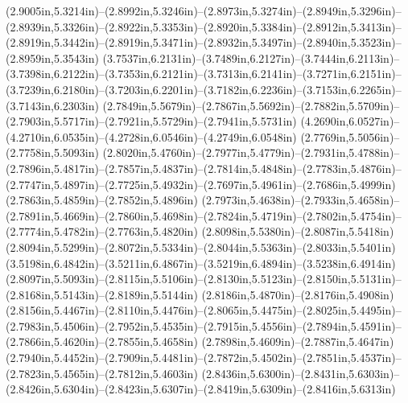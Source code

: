 (2.9005in,5.3214in)--(2.8992in,5.3246in)--(2.8973in,5.3274in)--(2.8949in,5.3296in)--(2.8939in,5.3326in)--(2.8922in,5.3353in)--(2.8920in,5.3384in)--(2.8912in,5.3413in)--(2.8919in,5.3442in)--(2.8919in,5.3471in)--(2.8932in,5.3497in)--(2.8940in,5.3523in)--(2.8959in,5.3543in) (3.7537in,6.2131in)--(3.7489in,6.2127in)--(3.7444in,6.2113in)--(3.7398in,6.2122in)--(3.7353in,6.2121in)--(3.7313in,6.2141in)--(3.7271in,6.2151in)--(3.7239in,6.2180in)--(3.7203in,6.2201in)--(3.7182in,6.2236in)--(3.7153in,6.2265in)--(3.7143in,6.2303in) (2.7849in,5.5679in)--(2.7867in,5.5692in)--(2.7882in,5.5709in)--(2.7903in,5.5717in)--(2.7921in,5.5729in)--(2.7941in,5.5731in) (4.2690in,6.0527in)--(4.2710in,6.0535in)--(4.2728in,6.0546in)--(4.2749in,6.0548in) (2.7769in,5.5056in)--(2.7758in,5.5093in) (2.8020in,5.4760in)--(2.7977in,5.4779in)--(2.7931in,5.4788in)--(2.7896in,5.4817in)--(2.7857in,5.4837in)--(2.7814in,5.4848in)--(2.7783in,5.4876in)--(2.7747in,5.4897in)--(2.7725in,5.4932in)--(2.7697in,5.4961in)--(2.7686in,5.4999in) (2.7863in,5.4859in)--(2.7852in,5.4896in) (2.7973in,5.4638in)--(2.7933in,5.4658in)--(2.7891in,5.4669in)--(2.7860in,5.4698in)--(2.7824in,5.4719in)--(2.7802in,5.4754in)--(2.7774in,5.4782in)--(2.7763in,5.4820in) (2.8098in,5.5380in)--(2.8087in,5.5418in) (2.8094in,5.5299in)--(2.8072in,5.5334in)--(2.8044in,5.5363in)--(2.8033in,5.5401in) (3.5198in,6.4842in)--(3.5211in,6.4867in)--(3.5219in,6.4894in)--(3.5238in,6.4914in) (2.8097in,5.5093in)--(2.8115in,5.5106in)--(2.8130in,5.5123in)--(2.8150in,5.5131in)--(2.8168in,5.5143in)--(2.8189in,5.5144in) (2.8186in,5.4870in)--(2.8176in,5.4908in) (2.8156in,5.4467in)--(2.8110in,5.4476in)--(2.8065in,5.4475in)--(2.8025in,5.4495in)--(2.7983in,5.4506in)--(2.7952in,5.4535in)--(2.7915in,5.4556in)--(2.7894in,5.4591in)--(2.7866in,5.4620in)--(2.7855in,5.4658in) (2.7898in,5.4609in)--(2.7887in,5.4647in) (2.7940in,5.4452in)--(2.7909in,5.4481in)--(2.7872in,5.4502in)--(2.7851in,5.4537in)--(2.7823in,5.4565in)--(2.7812in,5.4603in) (2.8436in,5.6300in)--(2.8431in,5.6303in)--(2.8426in,5.6304in)--(2.8423in,5.6307in)--(2.8419in,5.6309in)--(2.8416in,5.6313in)

